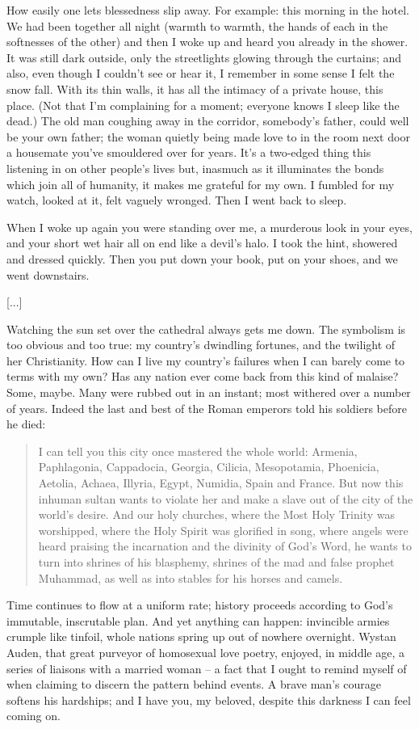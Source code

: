 How easily one lets blessedness slip away. For example: this morning in the hotel. We had been together all night (warmth to warmth, the hands of each in the softnesses of the other) and then I woke up and heard you already in the shower. It was still dark outside, only the streetlights glowing through the curtains; and also, even though I couldn't see or hear it, I remember in some sense I felt the snow fall. With its thin walls, it has all the intimacy of a private house, this place. (Not that I'm complaining for a moment; everyone knows I sleep like the dead.) The old man coughing away in the corridor, somebody's father, could well be your own father; the woman quietly being made love to in the room next door a housemate you've smouldered over for years. It's a two-edged thing this listening in on other people's lives but, inasmuch as it illuminates the bonds which join all of humanity, it makes me grateful for my own. I fumbled for my watch, looked at it, felt vaguely wronged. Then I went back to sleep.

When I woke up again you were standing over me, a murderous look in your eyes, and your short wet hair all on end like a devil's halo. I took the hint, showered and dressed quickly. Then you put down your book, put on your shoes, and we went downstairs.

[...]

Watching the sun set over the cathedral always gets me down. The symbolism is too obvious and too true: my country's dwindling fortunes, and the twilight of her Christianity. How can I live my country's failures when I can barely come to terms with my own? Has any nation ever come back from this kind of malaise? Some, maybe. Many were rubbed out in an instant; most withered over a number of years. Indeed the last and best of the Roman emperors told his soldiers before he died:

\begin{quote}
    I can tell you this city once mastered the whole world: Armenia, Paphlagonia, Cappadocia, Georgia, Cilicia, Mesopotamia, Phoenicia, Aetolia, Achaea, Illyria, Egypt, Numidia, Spain and France. But now this inhuman sultan wants to violate her and make a slave out of the city of the world's desire. And our holy churches, where the Most Holy Trinity was worshipped, where the Holy Spirit was glorified in song, where angels were heard praising the incarnation and the divinity of God's Word, he wants to turn into shrines of his blasphemy, shrines of the mad and false prophet Muhammad, as well as into stables for his horses and camels.
\end{quote}

Time continues to flow at a uniform rate; history proceeds according to God's immutable, inscrutable plan. And yet anything can happen: invincible armies crumple like tinfoil, whole nations spring up out of nowhere overnight. Wystan Auden, that great purveyor of homosexual love poetry, enjoyed, in middle age, a series of liaisons with a married woman -- a fact that I ought to remind myself of when claiming to discern the pattern behind events. A brave man's courage softens his hardships; and I have you, my beloved, despite this darkness I can feel coming on.

